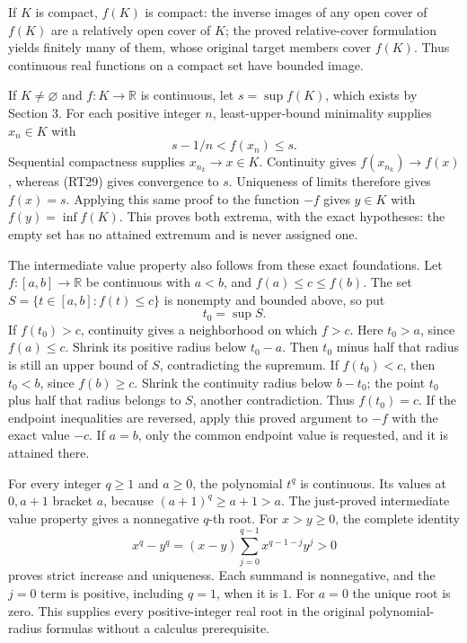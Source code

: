 \documentclass[
  11pt,
]{article}
\begin{document}
If \(K\) is compact, \(f(K)\) is compact: the inverse images of any open
cover of \(f(K)\) are a relatively open cover of \(K\); the proved
relative-cover formulation yields finitely many of them, whose original
target members cover \(f(K)\). Thus continuous real functions on a
compact set have bounded image.

If \(K\ne\varnothing\) and \(f:K\to\mathbb R\) is continuous, let
\(s=\sup f(K)\), which exists by Section 3. For each positive integer
\(n\), least-upper-bound minimality supplies \(x_n\in K\) with \[
s-1/n<f(x_n)\le s.
\tag{RT29}
\] Sequential compactness supplies \(x_{n_k}\to x\in K\). Continuity
gives \(f(x_{n_k})\to f(x)\), whereas (RT29) gives convergence to \(s\).
Uniqueness of limits therefore gives \(f(x)=s\). Applying this same
proof to the function \(-f\) gives \(y\in K\) with \(f(y)=\inf f(K)\).
This proves both extrema, with the exact hypotheses: the empty set has
no attained extremum and is never assigned one.

The intermediate value property also follows from these exact
foundations. Let \(f:[a,b]\to\mathbb R\) be continuous with \(a<b\), and
\(f(a)\le c\le f(b)\). The set \(S=\{t\in[a,b]:f(t)\le c\}\) is nonempty
and bounded above, so put \[
t_0=\sup S.
\tag{RT29a}
\] If \(f(t_0)>c\), continuity gives a neighborhood on which \(f>c\).
Here \(t_0>a\), since \(f(a)\le c\). Shrink its positive radius below
\(t_0-a\). Then \(t_0\) minus half that radius is still an upper bound
of \(S\), contradicting the supremum. If \(f(t_0)<c\), then \(t_0<b\),
since \(f(b)\ge c\). Shrink the continuity radius below \(b-t_0\); the
point \(t_0\) plus half that radius belongs to \(S\), another
contradiction. Thus \(f(t_0)=c\). If the endpoint inequalities are
reversed, apply this proved argument to \(-f\) with the exact value
\(-c\). If \(a=b\), only the common endpoint value is requested, and it
is attained there.

For every integer \(q\ge1\) and \(a\ge0\), the polynomial \(t^q\) is
continuous. Its values at \(0,a+1\) bracket \(a\), because
\((a+1)^q\ge a+1>a\). The just-proved intermediate value property gives
a nonnegative \(q\)-th root. For \(x>y\ge0\), the complete identity \[
x^q-y^q=(x-y)\sum_{j=0}^{q-1}x^{q-1-j}y^j>0
\tag{RT29b}
\] proves strict increase and uniqueness. Each summand is nonnegative,
and the \(j=0\) term is positive, including \(q=1\), when it is \(1\).
For \(a=0\) the unique root is zero. This supplies every
positive-integer real root in the original polynomial-radius formulas
without a calculus prerequisite.
\end{document}
